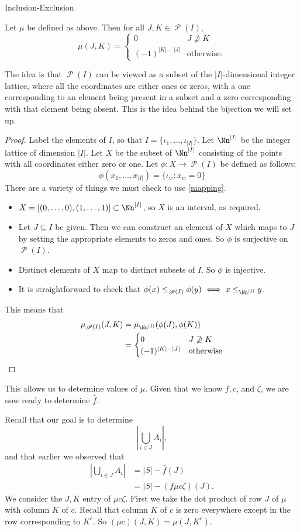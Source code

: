 \documentclass[12pt]{pom_thesis}
\DeclareMathOperator{\ps}{\mathscr{P}}
\begin{document}
\begin{chapter}{Inclusion-Exclusion}
\begin{thm}
Let $\mu$ be defined as above. Then for all $J, K \in \ps(I)$,
\[
\mu(J,K) = 
\begin{cases}
0 & J \not\supseteq K\\
(-1)^{|K|-|J|} & \text{otherwise}.
\end{cases}
\]
\end{thm}
The idea is that $\ps(I)$ can be viewed as a subset of the $|I|$-dimensional integer lattice, where all the coordinates are either ones or zeros, with a one corresponding to an element being present in a subset and a zero corresponding with that element being absent. This is the idea behind the bijection we will set up.
\begin{proof}
Label the elements of $I$, so that $I = \{\iota_1, \dots, \iota_{|I|}\}$. Let $\Nn^{|I|}$ be the integer lattice of dimension $|I|$. Let $X$ be the subset of $\Nn^{|I|}$ consisting of the points with all coordinates either zero or one. Let $\phi:X \rightarrow \ps(I)$ be defined as follows:
\[
\phi(x_1, \dots, x_{|I|}) = \{\iota_w : x_w = 0\}
\]
There are a variety of things we must check to use \ref{mapping}.
\begin{itemize}
\item $X = [(0,\dots,0), (1,\dots,1)] \subset \Nn^{|I|}$, so $X$ is an interval, as required.
\item Let $J \subseteq I$ be given. Then we can construct an element of $X$ which maps to $J$ by setting the appropriate elements to zeros and ones. So $\phi$ is surjective on $\ps(I)$. 
\item Distinct elements of $X$ map to distinct subsets of $I$. So $\phi$ is injective. 
\item It is straightforward to check that $\phi(x) \leq_{\ps(I)} \phi(y) \iff x \leq_{\Nn^{|I|}} y$.
\end{itemize}
This means that \begin{align*}
\mu_{\ps(I)}(J,K) &= \mu_{\Nn^{|I|}}(\phi(J), \phi(K)) \\
&= \begin{cases}
0 & J \not\supseteq K\\
(-1)^{|K|-|J|} & \text{otherwise}
\end{cases}
\end{align*}
\end{proof}
This allows us to determine values of $\mu$. Given that we know $f, c$, and $\zeta$, we are now ready to determine $\hat{f}$.

Recall that our goal is to determine 
\[
\left| \bigcup_{i \in J} A_i \right|,
\]
and that earlier we observed that
\begin{align*}
\left| \bigcup_{i \in J} A_i \right| &= |S| - \hat{f}(J)\\
&= |S| - (f\mu c\zeta)(J).
\end{align*}
We consider the $J,K$ entry of $\mu c \zeta$. First we take the dot product of row $J$ of $\mu$ with column $K$ of $c$. Recall that column $K$ of $c$ is zero everywhere except in the row corresponding to $K^c$. So $(\mu c)(J,K) = \mu(J, K^c)$. 


\end{chapter}
\end{document}
